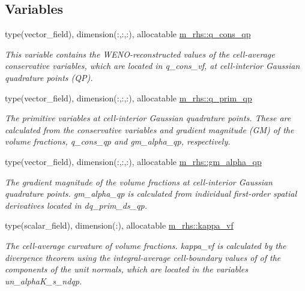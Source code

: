 \subsection*{Variables}
\begin{DoxyCompactItemize}
\item 
type(vector\+\_\+field), dimension(\+:,\+:,\+:), allocatable \hyperlink{namespacem__rhs_a646c5130e5b695e4eecf0e85a797ba7c}{m\+\_\+rhs\+::q\+\_\+cons\+\_\+qp}
\begin{DoxyCompactList}\small\item\em This variable contains the W\+E\+N\+O-\/reconstructed values of the cell-\/average conservative variables, which are located in q\+\_\+cons\+\_\+vf, at cell-\/interior Gaussian quadrature points (QP). \end{DoxyCompactList}\item 
type(vector\+\_\+field), dimension(\+:,\+:,\+:), allocatable \hyperlink{namespacem__rhs_af2af2a542d5af4fec546eda34af4ef74}{m\+\_\+rhs\+::q\+\_\+prim\+\_\+qp}
\begin{DoxyCompactList}\small\item\em The primitive variables at cell-\/interior Gaussian quadrature points. These are calculated from the conservative variables and gradient magnitude (GM) of the volume fractions, q\+\_\+cons\+\_\+qp and gm\+\_\+alpha\+\_\+qp, respectively. \end{DoxyCompactList}\item 
type(vector\+\_\+field), dimension(\+:,\+:,\+:), allocatable \hyperlink{namespacem__rhs_a1141883715f63c7b9d54dde459434fcc}{m\+\_\+rhs\+::gm\+\_\+alpha\+\_\+qp}
\begin{DoxyCompactList}\small\item\em The gradient magnitude of the volume fractions at cell-\/interior Gaussian quadrature points. gm\+\_\+alpha\+\_\+qp is calculated from individual first-\/order spatial derivatives located in dq\+\_\+prim\+\_\+ds\+\_\+qp. \end{DoxyCompactList}\item 
type(scalar\+\_\+field), dimension(\+:), allocatable \hyperlink{namespacem__rhs_a33739bde53c5512b62c38b0575973897}{m\+\_\+rhs\+::kappa\+\_\+vf}
\begin{DoxyCompactList}\small\item\em The cell-\/average curvature of volume fractions. kappa\+\_\+vf is calculated by the divergence theorem using the integral-\/average cell-\/boundary values of of the components of the unit normals, which are located in the variables un\+\_\+alpha\+K\+\_\+s\+\_\+ndqp. \end{DoxyCompactList}\item 

\end{DoxyCompactItemize}
